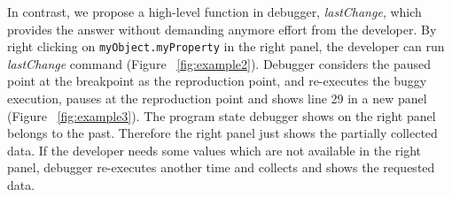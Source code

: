 \documentclass[preprint]{sigplanconf}
\begin{document}
In contrast, we propose a high-level function in debugger, \textit{lastChange}, which provides the answer without demanding anymore effort from the developer. By right clicking on \texttt{myObject.myProperty} in the right panel, the developer can run \textit{lastChange} command (Figure ~\ref{fig:example2}). Debugger considers the paused point at the breakpoint as the reproduction point, and re-executes the buggy execution, pauses at the reproduction point and shows line 29 in a new panel (Figure ~\ref{fig:example3}). The program state debugger shows on the right panel belongs to the past. Therefore the right panel just shows the partially collected data. If the developer needs some values which are not available in the right panel, debugger re-executes another time and collects and shows the requested data. 


\begin{figure}[htp]





\end{figure}
\end{document}
